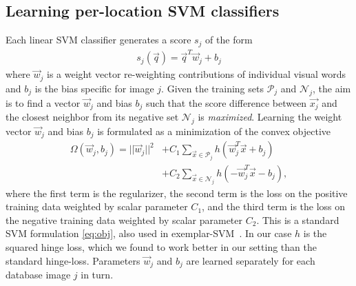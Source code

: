    \subsection{Learning per-location SVM classifiers }
      Each linear SVM classifier %
      {generates} a score $s_j$ of the form 
      \begin{align}
        s_j(\vec{q})=\vec{q}^T \vec{w}_j+b_j
        \label{eq:linear}
      \end{align}
      \noindent
      where $\vec{w}_j$ is a weight vector re-weighting contributions of individual visual words and $b_j$ is the bias specific for image $j$. Given the training sets $\mathcal P_j$ and $\mathcal N_j$, the aim is to find a vector $\vec{w}_j$ and bias $b_j$ such that the score difference between $\vec{x_j}$ and the closest neighbor from its negative set $\mathcal N_j$ is {\em maximized}.
      Learning the weight vector $\vec{w}_j$ and bias $b_j$ is formulated as a minimization of the convex objective 
      \begin{align}
        \nonumber
        \Omega(\vec{w}_j,b_j)=||\vec{w}_j||^{2}& +C_1\sum_{\vec{x}\in \mathcal P_j}h(\vec{w}_j^T\vec{x}+b_j)   \\
        \label{eq:obj}
                           & +C_2\sum_{\vec{x}\in \mathcal N_j}h(-\vec{w}_j^T\vec{x}-b_j), 
      \end{align}
      \noindent
      where the first term is the regularizer, the second term is the loss on the positive training data weighted by scalar parameter $C_1$, and the third term is the loss on the negative training data weighted by scalar parameter $C_2$.   
      This is a standard SVM formulation \eqref{eq:obj}, also used in exemplar-SVM~\cite{Malisiewicz11}.
      In our case $h$ is the squared hinge loss, which we found to work better in our setting than the standard hinge-loss. Parameters $\vec{w}_j$ and $b_j$ are learned separately for each database image $j$ in turn. 
     
